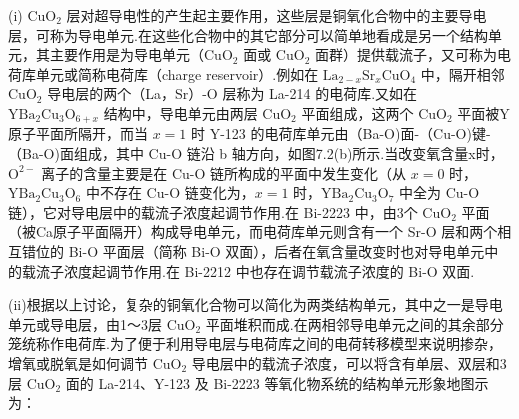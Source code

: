 (i) $\mathrm{CuO}_{2}$ 层对超导电性的产生起主要作用，这些层是铜氧化合物中的主要导电层，可称为导电单元.在这些化合物中的其它部分可以简单地看成是另一个结构单元，其主要作用是为导电单元（$\mathrm{CuO}_{2}$ 面或 $\mathrm{CuO}_{2}$ 面群）提供载流子，又可称为电荷库单元或简称电荷库（charge reservoir）.例如在 $\mathrm{La}_{2-x}\mathrm{Sr}_{x}\mathrm{CuO}_{4}$ 中，隔开相邻 $\mathrm{CuO}_{2}$ 导电层的两个（La，Sr）-O 层称为 La-214 的电荷库.又如在 $\mathrm{YBa}_{2}\mathrm{Cu}_{3}\mathrm{O}_{6+x}$ 结构中，导电单元由两层 $\mathrm{CuO}_{2}$ 平面组成，这两个 $\mathrm{CuO}_{2}$ 平面被Y原子平面所隔开，而当 $x=1$ 时 Y-123 的电荷库单元由（Ba-O)面-（Cu-O)键-（Ba-O)面组成，其中 Cu-O 链沿 b 轴方向，如图7.2(b)所示.当改变氧含量x时，$\mathrm{O}^{2-}$ 离子的含量主要是在 Cu-O 链所构成的平面中发生变化（从 $x=0$ 时，$\mathrm{YBa}_{2}\mathrm{Cu}_{3}\mathrm{O}_{6}$ 中不存在 Cu-O 链变化为，$x=1$ 时，$\mathrm{YBa}_{2}\mathrm{Cu}_{3}\mathrm{O}_{7}$ 中全为 Cu-O 链），它对导电层中的载流子浓度起调节作用.在 Bi-2223 中，由3个 $\mathrm{CuO}_{2}$ 平面（被Ca原子平面隔开）构成导电单元，而电荷库单元则含有一个 Sr-O 层和两个相互错位的 Bi-O 平面层（简称 Bi-O 双面），后者在氧含量改变时也对导电单元中的载流子浓度起调节作用.在 Bi-2212 中也存在调节载流子浓度的 Bi-O 双面.

(ii)根据以上讨论，复杂的铜氧化合物可以简化为两类结构单元，其中之一是导电单元或导电层，由1～3层 $\mathrm{CuO}_{2}$ 平面堆积而成.在两相邻导电单元之间的其余部分笼统称作电荷库.为了便于利用导电层与电荷库之间的电荷转移模型来说明掺杂，增氧或脱氧是如何调节 $\mathrm{CuO}_{2}$ 导电层中的载流子浓度，可以将含有单层、双层和3层 $\mathrm{CuO}_{2}$ 面的 La-214、Y-123 及 Bi-2223 等氧化物系统的结构单元形象地图示为：

